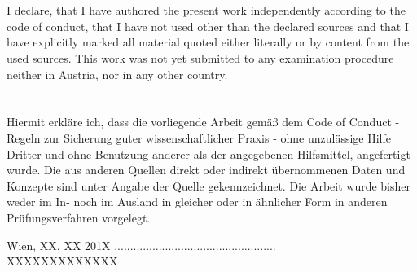 
\vfill

\section*{}

I declare, that I have authored the present work independently according to the code of conduct, that I have not used other than the declared sources and that I have explicitly marked all material quoted either literally or by content from the used sources. This work was not yet submitted to any examination procedure neither in Austria, nor in any other country.
\vspace{3cm}

\section*{}

Hiermit erkl\"are ich, dass die vorliegende Arbeit gem\"a{\ss} dem Code of Conduct - Regeln zur Sicherung guter wissenschaftlicher Praxis - ohne unzul\"assige Hilfe Dritter und ohne Benutzung anderer als der angegebenen Hilfsmittel, angefertigt wurde. Die aus anderen Quellen direkt oder indirekt \"ubernommenen Daten und Konzepte sind unter Angabe der Quelle gekennzeichnet. Die Arbeit wurde bisher weder im In- noch im Ausland in gleicher oder in \"ahnlicher Form in anderen Pr\"ufungsverfahren vorgelegt.
\vspace{4cm}

\indent \hspace{0.3cm} Wien, XX. XX 201X \hspace{2.9cm} ...................................................\\
\indent \hspace{9.5cm} XXXXXXXXXXXXX